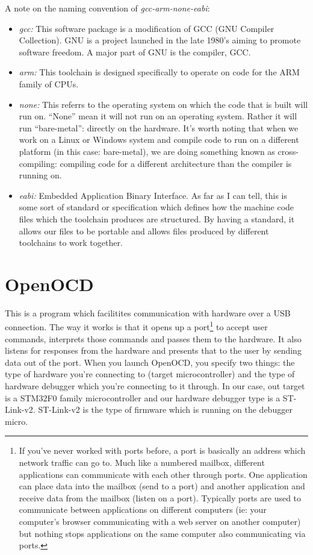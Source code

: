 A note on the naming convention of \emph{gcc-arm-none-eabi}:
\begin{itemize}
\item \emph{gcc:} This software package is a modification of GCC (GNU Compiler Collection). GNU is a project launched in the late 1980's aiming to promote software freedom. A major part of GNU is the compiler, GCC. 
\item \emph{arm:} This toolchain is designed specifically to operate on code for the ARM family of CPUs.
\item \emph{none:} This referrs to the operating system on which the code that is built will run on. ``None'' mean it will not run on an operating system. Rather it will run ``bare-metal'': directly on the hardware. It's worth noting that when we work on a Linux or Windows system and compile code to run on a different platform (in this case: bare-metal), we are doing something known as cross-compiling: compiling code for a different architecture than the compiler is running on.
\item \emph{eabi:} Embedded Application Binary Interface. As far as I can tell, this is some sort of standard or specification which defines how the machine code files which the toolchain produces are structured. By having a standard, it allows our files to be portable and allows files produced by different toolchains to work together.
\end{itemize}

\section{OpenOCD}
This is a program which facilitites communication with hardware over a USB connection. The way it works is that it opens up a port\footnote{If you've never worked with ports before, a port is basically an address which network traffic can go to. Much like a numbered mailbox, different applications can communicate with each other through ports. One application can place data into the mailbox (send to a port) and another application and receive data from the mailbox (listen on a port). Typically ports are used to communicate between applications on different computers (ie: your computer's browser communicating with a web server on another computer) but nothing stops applications on the same computer also communicating via ports.}
to accept user commands, interprets those commands and passes them to the hardware. It also listens for responses from the hardware and presents that to the user by sending data out of the port. When you launch OpenOCD, you specify two things: the type of hardware you're connecting to (target microcontroller) and the type of hardware debugger which you're connecting to it through. In our case, out target is a STM32F0 family microcontroller and our hardware debugger type is a ST-Link-v2. ST-Link-v2 is the type of firmware which is running on the debugger micro.

